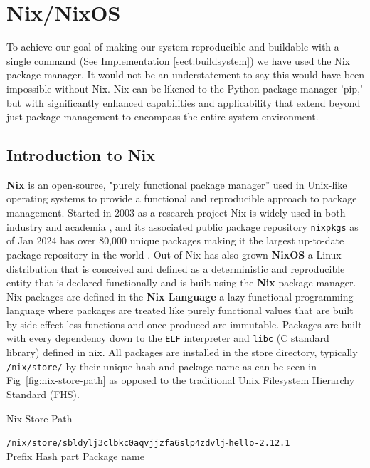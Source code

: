 \section{Nix/NixOS}

To achieve our goal of making our system reproducible and buildable with a single command (See Implementation \ref{sect:buildsystem}) we have used the Nix package manager. It would not be an understatement to say this would have been impossible without Nix. Nix can be likened to the Python package manager 'pip,' but with significantly enhanced capabilities and applicability that extend beyond just package management to encompass the entire system environment.

\subsection{Introduction to Nix}

\textbf{Nix} \cite{dolstra2004nix} is an open-source, "purely functional package manager” used in Unix-like operating systems to provide a functional and reproducible approach to package management. Started in 2003 as a research project Nix \cite{dolstra2006purely} is widely used in both industry \cite{NixCommunityNixOSWiki} and academia \cite{10.1145/3152493.3152556} \cite{https://doi.org/10.1002/qua.26872} \cite{LHCbNix}, and its associated public package repository \texttt{nixpkgs} \cite{NixPkgs} as of Jan 2024 has over 80,000 unique packages making it the largest up-to-date package repository in the world  \cite{Marakasov_2024}. Out of Nix has also grown \textbf{NixOS} \cite{10.1145/1411204.1411255} a Linux distribution that is conceived and defined as a deterministic and reproducible entity that is declared functionally and is built using the \textbf{Nix} package manager. \\

Nix packages are defined in the \textbf{Nix Language} a lazy functional programming language where packages are treated like purely functional values that are built by side effect-less functions and once produced are immutable. Packages are built with every dependency down to the \texttt{ELF} interpreter and \texttt{libc} (C standard library) defined in nix. All packages are installed in the store directory, typically \texttt{/nix/store/} by their unique hash and package name as can be seen in Fig~\ref{fig:nix-store-path} as opposed to the traditional Unix Filesystem Hierarchy Standard (FHS).

\begin{figureBox}[label={fig:nix-store-path}, width=0.8\linewidth]{Nix Store Path}
  \begin{tabbing}
    \={\color{Purple}\texttt{/nix/store/}}\={\color{RoyalBlue}\texttt{sbldylj3clbkc0aqvjjzfa6slp4zdvlj}}-\={\color{Orange}\texttt{hello-2.12.1}} \\
    \>\small{Prefix} \>\small {Hash part} \>\small {Package name}
  \end{tabbing}
\end{figureBox}

